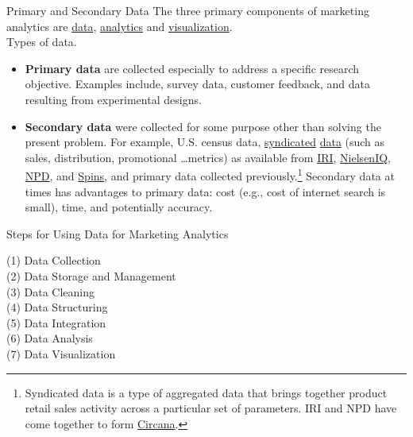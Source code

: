 \documentclass[pdf]{beamer}
\newcommand{\empr}[1]{{\color{franklinblue}\textbf{#1}}}
\theoremstyle{remark}
\theoremstyle{definition}
\begin{document}
\begin{frame}[t]{Primary and Secondary Data}
The three primary components of marketing analytics are \underline{data}, \underline{analytics} and \underline{visualization}. \\
\vspace{1.5ex}
Types of data. \\
\vspace{0.5ex}
\small
\begin{itemize}
\item \empr{Primary data} are collected especially to address a specific research objective.  Examples include, survey data, customer feedback, and data resulting from experimental designs.
\item \empr{Secondary data} were collected for some purpose other than solving the present problem.  For example, U.S. census data, \underline{syndicated} \underline{data} (such as sales, distribution, promotional \ldots metrics) as available from \href{https://www.iriworldwide.com/en-us}{IRI}, \href{https://nielseniq.com/global/en/}{NielsenIQ}, \href{https://www.npd.com/}{NPD}, and \href{https://www.spins.com/}{Spins}, and primary data collected previously.\footnote{Syndicated data is a type of aggregated data that brings together product retail sales activity across a particular set of parameters.  IRI and NPD have come together to form \href{https://www.circana.com/}{Circana}.} Secondary data at times has advantages to primary data:  cost (e.g., cost of internet search is small), time, and potentially accuracy. 
\end{itemize}
\end{frame}

\begin{frame}[t]{Steps for Using Data for Marketing Analytics}
\begin{description}
 \item [(1) Data Collection]
 \vspace{1.5ex}
 \item [(2) Data Storage and Management]
 \vspace{1.5ex}
 \item [(3) Data Cleaning] 
 \vspace{1.5ex}
 \item [(4) Data Structuring]
 \vspace{1.5ex}
 \item [(5) Data Integration]
 \vspace{1.5ex}
 \item [(6) Data Analysis]
 \vspace{1.5ex}
 \item [(7) Data Visualization]
 \vspace{1.5ex}
\end{description}
\end{frame}
\end{document}
